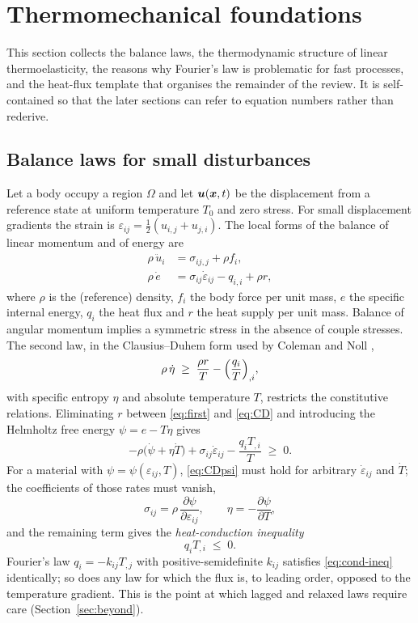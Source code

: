 \section{Thermomechanical foundations}\label{sec:foundations}
This section collects the balance laws, the thermodynamic structure of linear thermoelasticity, the reasons why Fourier's law is problematic for fast processes, and the heat-flux template that organises the remainder of the review. It is self-contained so that the later sections can refer to equation numbers rather than rederive.

\subsection{Balance laws for small disturbances}
Let a body occupy a region $\Omega$ and let $\bm u(\bm x,t)$ be the displacement from a reference state at uniform temperature $T_0$ and zero stress. For small displacement gradients the strain is $\varepsilon_{ij}=\tfrac12(u_{i,j}+u_{j,i})$. The local forms of the balance of linear momentum and of energy are
\begin{align}
\rho\,\ddot u_i &= \sigma_{ij,j}+\rho f_i, \label{eq:mom}\\
\rho\,\dot e &= \sigma_{ij}\dot\varepsilon_{ij}-q_{i,i}+\rho r, \label{eq:first}
\end{align}
where $\rho$ is the (reference) density, $f_i$ the body force per unit mass, $e$ the specific internal energy, $q_i$ the heat flux and $r$ the heat supply per unit mass. Balance of angular momentum implies a symmetric stress in the absence of couple stresses. The second law, in the Clausius--Duhem form used by Coleman and Noll \citep{Coleman1963},
\begin{equation}
\rho\,\dot\eta \;\ge\; \frac{\rho r}{T}-\Bigl(\frac{q_i}{T}\Bigr)_{,i}, \label{eq:CD}
\end{equation}
with specific entropy $\eta$ and absolute temperature $T$, restricts the constitutive relations. Eliminating $r$ between \eqref{eq:first} and \eqref{eq:CD} and introducing the Helmholtz free energy $\psi=e-T\eta$ gives
\begin{equation}
-\rho\bigl(\dot\psi+\eta\dot T\bigr)+\sigma_{ij}\dot\varepsilon_{ij}-\frac{q_i T_{,i}}{T}\;\ge\;0. \label{eq:CDpsi}
\end{equation}
For a material with $\psi=\psi(\varepsilon_{ij},T)$, \eqref{eq:CDpsi} must hold for arbitrary $\dot\varepsilon_{ij}$ and $\dot T$; the coefficients of those rates must vanish,
\begin{equation}
\sigma_{ij}=\rho\,\frac{\partial\psi}{\partial\varepsilon_{ij}},\qquad \eta=-\frac{\partial\psi}{\partial T},\label{eq:coleman}
\end{equation}
and the remaining term gives the \emph{heat-conduction inequality}
\begin{equation}
q_iT_{,i}\;\le\;0.\label{eq:cond-ineq}
\end{equation}
Fourier's law $q_i=-k_{ij}T_{,j}$ with positive-semidefinite $k_{ij}$ satisfies \eqref{eq:cond-ineq} identically; so does any law for which the flux is, to leading order, opposed to the temperature gradient. This is the point at which lagged and relaxed laws require care (Section~\ref{sec:beyond}).

